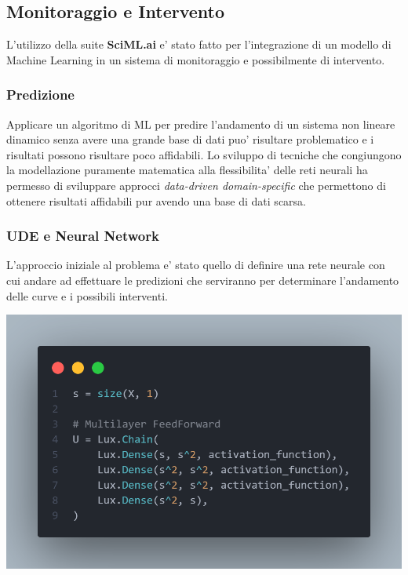 \subsection{Monitoraggio e Intervento}
L'utilizzo della suite \textbf{SciML.ai} e' stato fatto per l'integrazione
di un modello di Machine Learning in un sistema di monitoraggio e possibilmente di 
intervento. 

\subsubsection{Predizione}
Applicare un algoritmo di ML per predire l'andamento di un sistema non lineare dinamico 
senza avere una grande base di dati puo' risultare problematico e i risultati possono risultare 
poco affidabili. Lo sviluppo di tecniche che congiungono la modellazione puramente matematica
alla flessibilita' delle reti neurali ha permesso di sviluppare approcci \emph{data-driven domain-specific} 
\cite{rackauckas2020universal} \cite{Kim_2021} \cite{dandekar2022bayesian}
che permettono di ottenere risultati affidabili pur avendo una base di dati scarsa. 

\subsubsection*{UDE e Neural Network}
L'approccio iniziale al problema e' stato quello di definire una rete neurale con cui andare
ad effettuare le predizioni che serviranno per determinare l'andamento delle curve e i possibili
interventi.

\begin{minipage}{\linewidth}
	\centering
	\includegraphics[width=\textwidth]{img/lux_nn.png}
	\label{fig:lux_nn}
\end{minipage}

